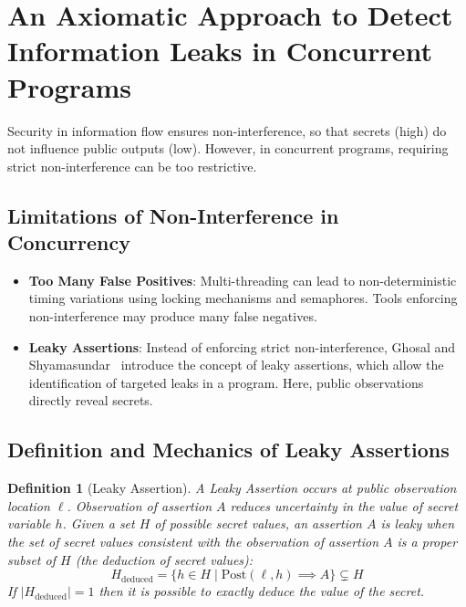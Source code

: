 \documentclass[a4paper,12pt]{report}
\newtheorem{definition}{Definition}[chapter]
\begin{document}
\section{An Axiomatic Approach to Detect Information Leaks in Concurrent Programs}
Security in information flow ensures non-interference, so that secrets (high) do not influence public outputs (low). However, in concurrent programs, requiring strict non-interference can be too restrictive.

\subsection{Limitations of Non-Interference in Concurrency}
\begin{itemize}[itemsep=0.25em, topsep=0.15em]
    \item \textbf{Too Many False Positives}: Multi-threading can lead to non-deterministic timing variations using locking mechanisms and semaphores. Tools enforcing non-interference may produce many false negatives.
    \item \textbf{Leaky Assertions}: Instead of enforcing strict non-interference, Ghosal and Shyamasundar~\cite{ghosal2021axiomatic} introduce the concept of leaky assertions, which allow the identification of targeted leaks in a program. Here, public observations directly reveal secrets.
\end{itemize}

\subsection{Definition and Mechanics of Leaky Assertions}
\begin{definition}[Leaky Assertion]
A Leaky Assertion occurs at public observation location $\ell$. Observation of assertion $A$ reduces uncertainty in the value of secret variable $h$. Given a set $H$ of possible secret values, an assertion $A$ is leaky when the set of secret values consistent with the observation of assertion $A$ is a proper subset of $H$ (the deduction of secret values):
\begin{equation}
    H_{\text{deduced}} = \{ h \in H \mid \mathrm{Post}(\ell, h) \implies A \} \subsetneq H
\end{equation}
If $|H_{\text{deduced}}| = 1$ then it is possible to exactly deduce the value of the secret.
\end{definition}
\end{document}
